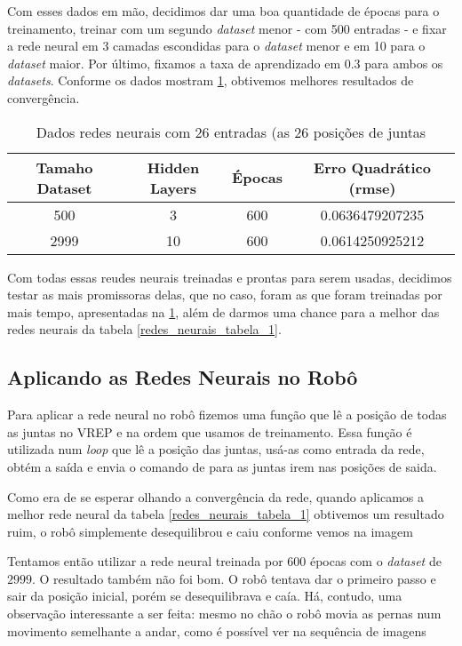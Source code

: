 \documentclass[twoside,conference,a4paper]{IEEEtran}
\begin{document}
Com esses dados em mão, decidimos dar uma boa quantidade de épocas para o treinamento, treinar com um segundo \textsl{dataset} menor  - com 500 entradas - e fixar a rede neural em 3  camadas escondidas para o \textsl{dataset} menor e em 10 para o \textsl{dataset} maior. Por último, fixamos a taxa de aprendizado em $0.3$ para ambos os \textsl{datasets}. Conforme os dados mostram \ref{redes_neurais_tabela_3}, obtivemos melhores resultados de convergência.

 \begin{table}[h]
\caption{Dados redes neurais com 26 entradas (as 26 posições de juntas}
 \label{redes_neurais_tabela_3}
 \begin{center}
 \begin{tabular}{|c|c|c|c|}
 \hline
 Tamaho Dataset & Hidden Layers & Épocas & Erro Quadrático (rmse) \\
 \hline
 500  & 3 & 600 & 0.0636479207235 \\
 2999 & 10 & 600 & 0.0614250925212 \\
 \hline
 \end{tabular}
 \end{center}
 \end{table}  

Com todas essas reudes neurais treinadas e prontas para serem usadas, decidimos testar as mais promissoras delas, que no caso, foram as que foram treinadas por mais tempo, apresentadas na \ref{redes_neurais_tabela_3}, além de darmos uma chance para a melhor das redes neurais da tabela \ref{redes_neurais_tabela_1}.

\subsection{Aplicando as Redes Neurais no Robô}

Para aplicar a rede neural no robô fizemos uma função que lê a posição de todas as juntas no VREP e na ordem que usamos de treinamento. Essa função é utilizada num \textsl{loop} que lê a posição das juntas, usá-as como entrada da rede, obtém a saída e envia o comando de para as juntas irem nas posições de saida.

Como era de se esperar olhando a convergência da rede, quando aplicamos a melhor rede neural  da tabela \ref{redes_neurais_tabela_1} obtivemos um resultado ruim, o robô simplemente desequilibrou e caiu conforme vemos na imagem %


Tentamos então utilizar a rede neural treinada por 600 épocas com o \textsl{dataset} de $2999$. O resultado também não foi bom. O robô tentava dar o primeiro passo e sair da posição inicial, porém se desequilibrava e caía. Há, contudo, uma observação interessante a ser feita: mesmo no chão o robô movia as pernas num movimento semelhante a andar, como é possível ver na sequência de imagens %
\end{document}
